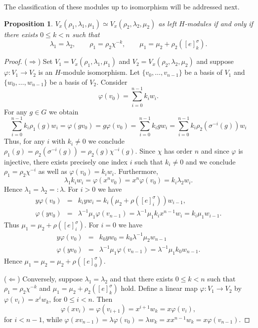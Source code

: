 \documentclass[11pt, twoside]{amsart}
\newtheorem{lemma}[theorem]{Lemma}
\newtheorem{proposition}[theorem]{Proposition}
\theoremstyle{definition}
\newcommand{\wind}[2]{[#1]_{#2}^{\sigma}}
\begin{document}
%
The classification of these modules up to isomorphism will be addressed next. 
%
%
\begin{proposition}\label{prop:iso-V-lambda-mu-rho}
$V_x(\rho_1, \lambda_1,\mu_1) \simeq V_x (\rho_2, \lambda_2,\mu_2)$ as left $H$-modules if and only if there exists $0\leq k <n$ such that 
    $$\lambda_1=\lambda_2, \qquad \rho_1=\rho_2\chi^{-k},  \qquad \mu_1 = \mu_2 + \rho_2(\wind{e}{k}).$$
\end{proposition}
\begin{proof}
($\Rightarrow$) 
Set $V_1=V_x(\rho_1, \lambda_1,\mu_1)$ and $V_2=V_x (\rho_2, \lambda_2,\mu_2)$ and suppose  $\varphi:V_1\to V_2$ is an $H$-module isomorphism. Let $\{v_0,\ldots, v_{n-1}\}$ be a basis of $V_1$ and $\{w_0, \ldots, w_{n-1}\}$ be a basis of $V_2$. Consider 
%
\[
\varphi(v_0) = \sum_{i=0}^{n-1} k_i w_i.
\]
%
For any $g\in G$ we obtain
%
\[
\sum_{i=0}^{n-1} k_i \rho_1(g) w_i = \varphi(gv_0) = g\varphi(v_0) = \sum_{i=0}^{n-1} k_i gw_i 
= \sum_{i=0}^{n-1} k_i \rho_2(\sigma^{-i}(g)) w_i 
\]
%
Thus, for any $i$ with $k_i\neq 0$ we conclude $\rho_1(g) = \rho_2(\sigma^{-i}(g)) = \rho_2(g)\chi^{-i}(g)$. Since $\chi$ has order $n$ and since $\varphi$ is injective, there exists precisely one index $i$ such that $k_i\neq 0$ and we conclude $\rho_1 = \rho_2 \chi^{-i}$ as well as $\varphi(v_0)= k_i w_i$. Furthermore, 
%
\[ \lambda_1 k_i w_i = \varphi(x^n v_0) = x^n \varphi(v_0) =k_i \lambda_2 w_i.\]
%
Hence $\lambda_1=\lambda_2 =: \lambda $.  For $i>0$ we have 
%
\begin{eqnarray*}
 y\varphi(v_0) &=& k_i yw_i = k_i (\mu_2 + \rho(\wind{e}{i}))w_{i-1},\\
 \varphi(yv_0) &=& \lambda^{-1}\mu_1 \varphi(v_{n-1})  = \lambda^{-1}\mu_1 k_i x^{n-1} w_i   = k_i \mu_1 w_{i-1} .
 \end{eqnarray*}
%
Thus $\mu_1 = \mu_2 + \rho(\wind{e}{i})$. For $i=0$ we have 
%
\begin{eqnarray*}
 y\varphi(v_0) &=& k_0 y w_0 = k_0\lambda^{-1}\mu_2 w_{n-1} \\
 \varphi(yv_0) &=& \lambda^{-1}\mu_1 \varphi(v_{n-1})  = \lambda^{-1}\mu_1 k_0 w_{n-1}.
 \end{eqnarray*}
Hence $\mu_1 = \mu_2 = \mu_2 + \rho(\wind{e}{0})$.

($\Leftarrow$) Conversely, suppose $\lambda_1=\lambda_2$ and that there exists $0\leq k < n$ such that  $\rho_1=\rho_2\chi^{-k} $ and $\mu_1 = \mu_2 + \rho_2(\wind{e}{k})$ hold. 
Define a linear map $\varphi: V_1 \to V_2$ by $\varphi(v_{i}) = x^i w_k$, for $0\leq i<n$. Then
\[ \varphi(xv_i) = \varphi(v_{i+1}) = x^{i+1}w_k = x \varphi(v_i),\]  for $i<n-1$,  while  $\varphi(xv_{n-1})=\lambda \varphi(v_0)= \lambda w_k = x x^{n-1} w_k= x\varphi(v_{n-1}).$


\end{proof}
\end{document}
